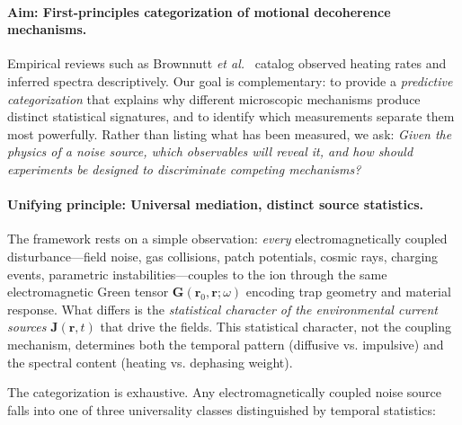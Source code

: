 \paragraph{Aim: First-principles categorization of motional decoherence mechanisms.} 
Empirical reviews such as Brownnutt \textit{et al.}~\cite{Brownnutt2015} catalog observed heating rates and inferred spectra descriptively. Our goal is complementary: to provide a \emph{predictive categorization} that explains why different microscopic mechanisms produce distinct statistical signatures, and to identify which measurements separate them most powerfully. Rather than listing what has been measured, we ask: \emph{Given the physics of a noise source, which observables will reveal it, and how should experiments be designed to discriminate competing mechanisms?}

\paragraph{Unifying principle: Universal mediation, distinct source statistics.}
The framework rests on a simple observation: \emph{every} electromagnetically coupled disturbance—field noise, gas collisions, patch potentials, cosmic rays, charging events, parametric instabilities—couples to the ion through the same electromagnetic Green tensor $\mathbf{G}(\mathbf{r}_0,\mathbf{r};\omega)$ encoding trap geometry and material response. What differs is the \emph{statistical character of the environmental current sources} $\mathbf{J}(\mathbf{r},t)$ that drive the fields. This statistical character, not the coupling mechanism, determines both the temporal pattern (diffusive vs. impulsive) and the spectral content (heating vs. dephasing weight).

The categorization is exhaustive. Any electromagnetically coupled noise source falls into one of three universality classes distinguished by temporal statistics:



